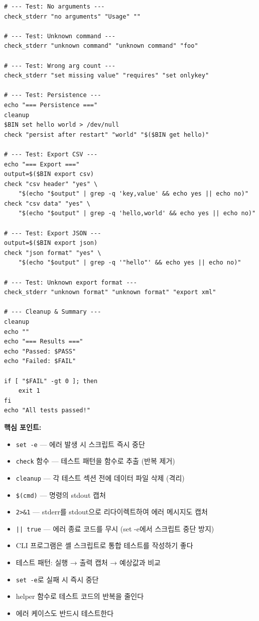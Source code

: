\documentclass[11pt,a4paper]{book}
\newcommand{\file}[1]{\texttt{#1}}
\newcommand{\code}[1]{\texttt{#1}}
\begin{document}
\begin{lstlisting}[style=shell,title={\file{test.sh}}]
# --- Test: No arguments ---
check_stderr "no arguments" "Usage" ""

# --- Test: Unknown command ---
check_stderr "unknown command" "unknown command" "foo"

# --- Test: Wrong arg count ---
check_stderr "set missing value" "requires" "set onlykey"

# --- Test: Persistence ---
echo "=== Persistence ==="
cleanup
$BIN set hello world > /dev/null
check "persist after restart" "world" "$($BIN get hello)"

# --- Test: Export CSV ---
echo "=== Export ==="
output=$($BIN export csv)
check "csv header" "yes" \
    "$(echo "$output" | grep -q 'key,value' && echo yes || echo no)"
check "csv data" "yes" \
    "$(echo "$output" | grep -q 'hello,world' && echo yes || echo no)"

# --- Test: Export JSON ---
output=$($BIN export json)
check "json format" "yes" \
    "$(echo "$output" | grep -q '"hello"' && echo yes || echo no)"

# --- Test: Unknown export format ---
check_stderr "unknown format" "unknown format" "export xml"

# --- Cleanup & Summary ---
cleanup
echo ""
echo "=== Results ==="
echo "Passed: $PASS"
echo "Failed: $FAIL"

if [ "$FAIL" -gt 0 ]; then
    exit 1
fi
echo "All tests passed!"
\end{lstlisting}

\textbf{핵심 포인트:}
\begin{itemize}[nosep]
\item \code{set -e} — 에러 발생 시 스크립트 즉시 중단
\item \code{check} 함수 — 테스트 패턴을 함수로 추출 (반복 제거)
\item \code{cleanup} — 각 테스트 섹션 전에 데이터 파일 삭제 (격리)
\item \code{\$(cmd)} — 명령의 stdout 캡처
\item \code{2>\&1} — stderr를 stdout으로 리다이렉트하여 에러 메시지도 캡처
\item \code{|| true} — 에러 종료 코드를 무시 (set -e에서 스크립트 중단 방지)
\end{itemize}

\begin{summarybox}
\begin{itemize}[nosep]
\item CLI 프로그램은 셸 스크립트로 통합 테스트를 작성하기 좋다
\item 테스트 패턴: 실행 → 출력 캡처 → 예상값과 비교
\item \code{set -e}로 실패 시 즉시 중단
\item helper 함수로 테스트 코드의 반복을 줄인다
\item 에러 케이스도 반드시 테스트한다
\end{itemize}
\end{summarybox}
\end{document}
